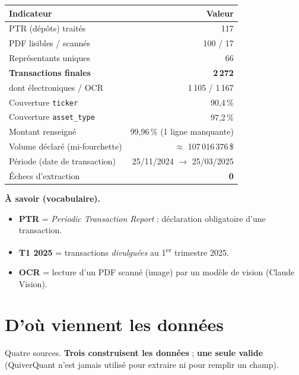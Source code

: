 \documentclass[11pt,a4paper]{article}
\begin{document}
\begin{center}
\begin{tabular}{@{}l r@{}}
\toprule
\textbf{Indicateur} & \textbf{Valeur} \\
\midrule
PTR (dépôts) traités & 117 \\
PDF lisibles / scannés & 100 / 17 \\
Représentants uniques & 66 \\
\textbf{Transactions finales} & \textbf{2\,272} \\
\quad dont électroniques / OCR & 1\,105 / 1\,167 \\
Couverture \texttt{ticker} & 90,4\,\% \\
Couverture \texttt{asset\_type} & 97,2\,\% \\
Montant renseigné & 99,96\,\% (1 ligne manquante) \\
Volume déclaré (mi-fourchette) & $\approx$ 107\,016\,376\,\$ \\
Période (date de transaction) & 25/11/2024 $\to$ 25/03/2025 \\
Échecs d'extraction & \textcolor{okgreen}{\textbf{0}} \\
\bottomrule
\end{tabular}
\end{center}

\medskip
\noindent\textbf{À savoir (vocabulaire).}
\begin{itemize}
  \item \textbf{PTR} = \emph{Periodic Transaction Report} : déclaration obligatoire d'une transaction.
  \item \textbf{T1 2025} = transactions \emph{divulguées} au 1\textsuperscript{er} trimestre 2025.
  \item \textbf{OCR} = lecture d'un PDF scanné (image) par un modèle de vision (Claude Vision).
\end{itemize}

\section{D'où viennent les données}

Quatre sources. \textbf{Trois construisent les données} ; \textbf{une seule valide} (QuiverQuant
n'est jamais utilisé pour extraire ni pour remplir un champ).
\end{document}

